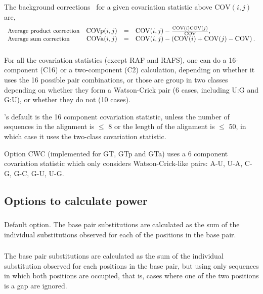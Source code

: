 The background corrections~\citep{DunnGloor07} for a given
covariation statistic above $\mathrm{COV}(i,j)$ are,
%
\[
\begin{array}{lrcl}
  \mbox{\small Average product correction} & \mathrm{COVp}(i,j) & = &  \mathrm{COV}(i,j) - \frac { \mathrm{COV}(i) \mathrm{COV}(j) } { \mathrm{COV} }, \\
  \mbox{\small Average sum correction}     & \mathrm{COVa}(i,j) & = &  \mathrm{COV}(i,j) - \left( \mathrm{COV}(i) + \mathrm{COV}(j) - \mathrm{COV} \right). \\
\end{array}
\]



\subsubsection{}
For all the covariation statistics (except RAF and RAFS), one can do a
16-component (C16) or a two-component (C2) calculation, depending on
whether it uses the 16 possible pair combinations, or those are group
in two classes depending on whether they form a Watson-Crick pair (6
cases, including U:G and G:U), or whether they do not (10 cases).

\rscape's default is the 16 component covariation statistic, unless
the number of sequences in the alignment is $\leq$ 8 or the length of
the alignment is $\leq$ 50, in which case it uses the two-class
covariation statistic.

Option CWC (implemented for GT, GTp and GTa) uses a 6 component covariation statistic which only considers Watson-Crick-like pairs: A-U, U-A, C-G, G-C, G-U, U-G.

\subsection{Options to calculate power}

\subsubsection{} Default option. The base pair substitutions are calculated as the sum of the individual substitutions observed for each of the positions in the base pair.

\subsubsection{} The base pair substitutions are calculated as the sum of the individual substitution observed for each positions in the base pair, but using only sequences in which both positions are occupied, that is, cases where one of the two positions is a gap are ignored.

